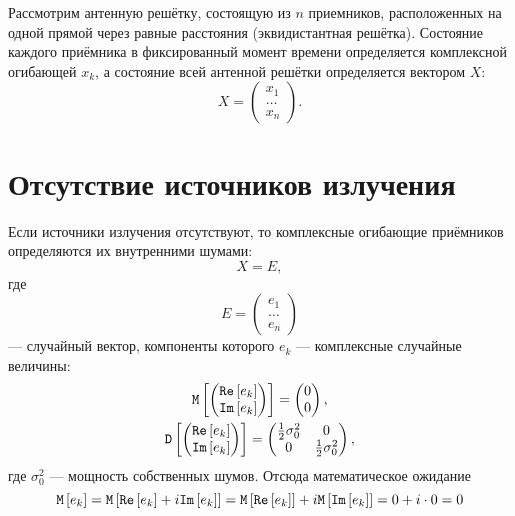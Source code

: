 Рассмотрим антенную решётку, состоящую из $n$ приемников, расположенных на одной прямой через равные расстояния (эквидистантная решётка). Состояние каждого
приёмника в фиксированный момент времени определяется комплексной огибающей $x_k$, а состояние всей антенной решётки определяется вектором $X$:
\[
    X =
    \begin{pmatrix}
        x_1   \\
        \dots \\
        x_n
    \end{pmatrix}
    .
\]


\section{Отсутствие источников излучения}

Если источники излучения отсутствуют, то комплексные огибающие приёмников определяются их внутренними шумами:
\[
    X = E,
\]
где
\[
    E =
    \begin{pmatrix}
        e_1   \\
        \dots \\
        e_n
    \end{pmatrix}
\]
--- случайный вектор, компоненты которого $e_k$ --- комплексные случайные величины:
\begin{gather*}
    \mathtt{M} \left [ 
        \begin{pmatrix}
            \mathtt{Re} \left [ e_k \right ] \\ \mathtt{Im} \left [ e_k \right ]
        \end{pmatrix}
     \right ] =
    \begin{pmatrix}
        0 \\
        0
    \end{pmatrix} , \\
    \mathtt{D} \left [ 
        \begin{pmatrix}
            \mathtt{Re} \left [ e_k \right ] \\ \mathtt{Im} \left [ e_k \right ]
        \end{pmatrix}
     \right ] =
    \begin{pmatrix}
        \frac{1}{2} \sigma_0^2 & 0                      \\
        0                      & \frac{1}{2} \sigma_0^2
    \end{pmatrix} ,
\end{gather*}
где $\sigma_0^2$ --- мощность собственных шумов. Отсюда математическое ожидание
\[
    \mathtt{M} \left [ e_k \right ]
    = \mathtt{M} \left [ \mathtt{Re} \left [ e_k \right ] + i \mathtt{Im} \left [ e_k \right ] \right ]
    = \mathtt{M} \left [ \mathtt{Re} \left [ e_k \right ] \right ] + i \mathtt{M} \left [ \mathtt{Im} \left [ e_k \right ] \right ]
    = 0 + i \cdot 0
    = 0
\]
